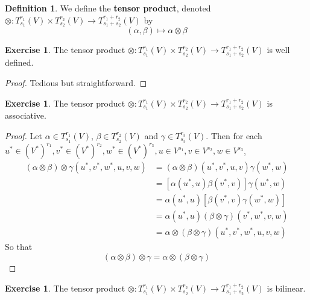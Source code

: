 \documentclass{book}
\theoremstyle{definition}
\newtheorem{defn}[definition]{Definition}
\newtheorem{ex}[definition]{Exercise}
\newcommand{\al}{\alpha}
\newcommand{\be}{\beta}
\newcommand{\gam}{\gamma}
\DeclareMathOperator*{\0}{\mbf{0}}
\DeclareMathOperator*{\1}{\mbf{1}}
\newcommand{\tbf}[1]{\textbf{#1}}
\newcommand{\Tn}[1]{T^{r_{#1}}_{s_{#1}}(V)}
\newcommand{\Tnp}{T^{r_1 + r_2}_{s_1 + s_2}(V)}
\begin{document}
	\begin{defn}
	We define the \tbf{tensor product}, denoted $\otimes : \Tn{1} \times  \Tn{2} \rightarrow \Tnp$ by $$(\al, \be) \mapsto \al \otimes \be $$   
	\end{defn}
	
	\begin{ex}
	The tensor product $\otimes : \Tn{1} \times  \Tn{2} \rightarrow \Tnp$ is well defined. 
	\end{ex}
	
	\begin{proof}
	Tedious but straightforward.
\end{proof}	
	
	\begin{ex}
	The tensor product $\otimes : \Tn{1} \times  \Tn{2} \rightarrow \Tnp$ is associative. 
	\end{ex}
	
	\begin{proof}
	Let $\al \in \Tn{1}$, $\be \in \Tn{2}$ and $\gam \in \Tn{3}$. Then for each $u^* \in (V^*)^{r_1}, v^* \in (V^*)^{r_2}, w^* \in (V^*)^{r_3}, u \in V^{s_1}, v \in V^{s_2}, w \in V^{s_3}$,  
	\begin{align*}
	(\al \otimes \be) \otimes \gam (u^*, v^*, w^*, u, v, w) 
	&= (\al \otimes \be) (u^*, v^*, u, v) \gam (w^*, w) \\
	&= [\al(u^*, u) \be(v^*, v)] \gam(w^*, w) \\
	&= \al(u^*, u) [\be(v^*, v) \gam(w^*, w)] \\
	&= \al(u^*, u) (\be \otimes \gam) (v^*, w^*, v, w) \\
	&= \al \otimes (\be \otimes \gam)(u^*, v^*, w^*, u, v, w) 
	\end{align*}
	So that $$(\al \otimes \be) \otimes \gam = \al \otimes (\be \otimes \gam)$$
\end{proof}		
	
	\begin{ex}
	The tensor product $\otimes : \Tn{1} \times  \Tn{2} \rightarrow \Tnp$ is bilinear. 
	\end{ex}
	
\end{document}
